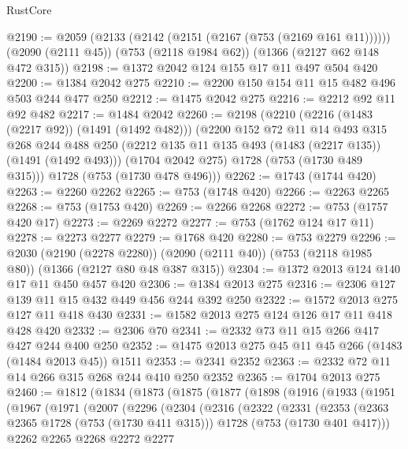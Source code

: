 \begin{lexlean}{RustCore}
\begin{coremodule}
@2190 := @2059
    (@2133 (@2142 (@2151 (@2167 (@753 (@2169 @161 @11))))))
    (@2090 (@2111 @45))
    (@753 (@2118 @1984 @62))
    (@1366 (@2127 @62 @148 @472 @315))
@2198 := @1372 @2042 @124 @155 @17 @11 @497 @504 @420
@2200 := @1384 @2042 @275
@2210 := @2200 @150 @154 @11 @15 @482 @496 @503 @244 @477 @250
@2212 := @1475 @2042 @275
@2216 := @2212 @92 @11 @92 @482
@2217 := @1484 @2042
@2260 := @2198
    (@2210
      (@2216 (@1483 (@2217 @92)) (@1491 (@1492 @482)))
      (@2200
        @152
        @72
        @11
        @14
        @493
        @315
        @268
        @244
        @488
        @250
        (@2212 @135 @11 @135 @493 (@1483 (@2217 @135)) (@1491 (@1492 @493)))
        (@1704 @2042 @275)
        @1728
        (@753 (@1730 @489 @315)))
      @1728
      (@753 (@1730 @478 @496)))
@2262 := @1743 (@1744 @420)
@2263 := @2260 @2262
@2265 := @753 (@1748 @420)
@2266 := @2263 @2265
@2268 := @753 (@1753 @420)
@2269 := @2266 @2268
@2272 := @753 (@1757 @420 @17)
@2273 := @2269 @2272
@2277 := @753 (@1762 @124 @17 @11)
@2278 := @2273 @2277
@2279 := @1768 @420
@2280 := @753 @2279
@2296 := @2030
    (@2190 (@2278 @2280))
    (@2090 (@2111 @40))
    (@753 (@2118 @1985 @80))
    (@1366 (@2127 @80 @48 @387 @315))
@2304 := @1372 @2013 @124 @140 @17 @11 @450 @457 @420
@2306 := @1384 @2013 @275
@2316 := @2306 @127 @139 @11 @15 @432 @449 @456 @244 @392 @250
@2322 := @1572 @2013 @275 @127 @11 @418 @430
@2331 := @1582 @2013 @275 @124 @126 @17 @11 @418 @428 @420
@2332 := @2306 @70
@2341 := @2332 @73 @11 @15 @266 @417 @427 @244 @400 @250
@2352 := @1475 @2013 @275 @45 @11 @45 @266 (@1483 (@1484 @2013 @45)) @1511
@2353 := @2341 @2352
@2363 := @2332 @72 @11 @14 @266 @315 @268 @244 @410 @250 @2352
@2365 := @1704 @2013 @275
@2460 := @1812
    (@1834
      (@1873
        (@1875
          (@1877
            (@1898
              (@1916
                (@1933
                  (@1951
                    (@1967
                      (@1971
                        (@2007
                          (@2296
                            (@2304
                              (@2316
                                (@2322
                                  (@2331
                                    (@2353
                                      (@2363 @2365 @1728 (@753 (@1730 @411 @315)))
                                      @1728
                                      (@753 (@1730 @401 @417)))
                                    @2262
                                    @2265
                                    @2268
                                    @2272
                                    @2277

\end{coremodule}
\end{lexlean}
